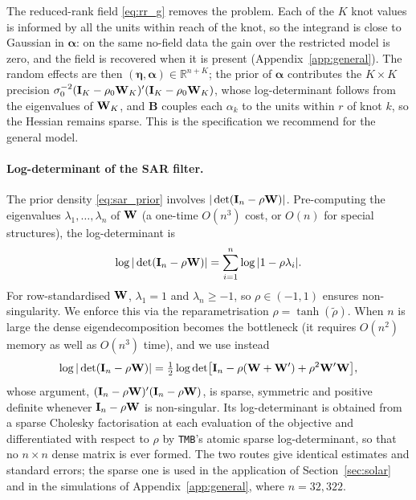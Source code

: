 The reduced-rank field \eqref{eq:rr_g} removes the problem.
Each of the $K$ knot values is informed by all the units within reach of the knot, so the integrand is close to Gaussian in $\boldsymbol{\alpha}$: on the same no-field data the gain over the restricted model is zero, and the field is recovered when it is present (Appendix~\ref{app:general}).
The random effects are then $(\boldsymbol{\eta}, \boldsymbol{\alpha}) \in \mathbb{R}^{n+K}$; the prior of $\boldsymbol{\alpha}$ contributes the $K\times K$ precision $\sigma_0^{-2}(\mathbf{I}_K - \rho_0\mathbf{W}_K)'(\mathbf{I}_K - \rho_0\mathbf{W}_K)$, whose log-determinant follows from the eigenvalues of $\mathbf{W}_K$, and $\mathbf{B}$ couples each $\alpha_k$ to the units within $r$ of knot $k$, so the Hessian remains sparse.
This is the specification we recommend for the general model.

\paragraph{Log-determinant of the SAR filter.}
The prior density \eqref{eq:sar_prior} involves $|\det(\mathbf{I}_n - \rho\mathbf{W})|$.
Pre-computing the eigenvalues $\lambda_1,\ldots,\lambda_n$ of $\mathbf{W}$ (a one-time $O(n^3)$ cost, or $O(n)$ for special structures), the log-determinant is
\begin{equation}\label{eq:logdet}
  \log|\det(\mathbf{I}_n - \rho\mathbf{W})| = \sum_{i=1}^{n}\log|1 - \rho\lambda_i|.
\end{equation}
For row-standardised $\mathbf{W}$, $\lambda_1 = 1$ and $\lambda_n \geq -1$, so $\rho \in (-1,1)$ ensures non-singularity.
We enforce this via the reparametrisation $\rho = \tanh(\tilde{\rho})$.
When $n$ is large the dense eigendecomposition becomes the bottleneck (it requires $O(n^2)$ memory as well as $O(n^3)$ time), and we use instead
\begin{equation}\label{eq:logdet_sparse}
  \log|\det(\mathbf{I}_n - \rho\mathbf{W})| = \tfrac12\log\det\bigl[\mathbf{I}_n - \rho(\mathbf{W}+\mathbf{W}') + \rho^2\mathbf{W}'\mathbf{W}\bigr],
\end{equation}
whose argument, $(\mathbf{I}_n-\rho\mathbf{W})'(\mathbf{I}_n-\rho\mathbf{W})$, is sparse, symmetric and positive definite whenever $\mathbf{I}_n-\rho\mathbf{W}$ is non-singular.
Its log-determinant is obtained from a sparse Cholesky factorisation at each evaluation of the objective and differentiated with respect to $\rho$ by \texttt{TMB}'s atomic sparse log-determinant, so that no $n\times n$ dense matrix is ever formed.
The two routes give identical estimates and standard errors; the sparse one is used in the application of Section~\ref{sec:solar} and in the simulations of Appendix~\ref{app:general}, where $n = 32{,}322$.

